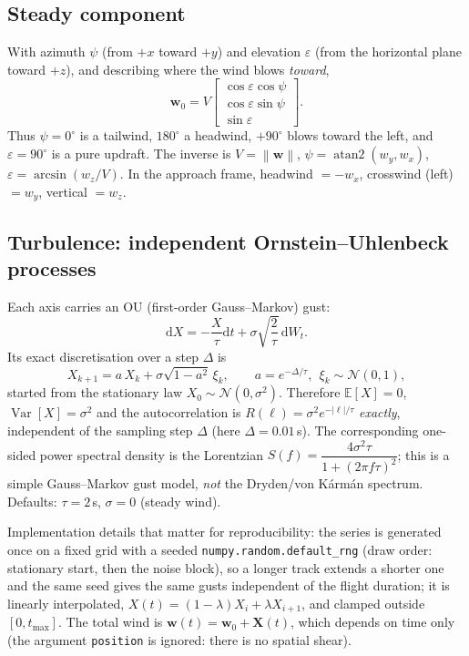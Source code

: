 \documentclass[11pt,a4paper]{article}
\newcommand{\vc}[1]{\bm{#1}}
\newcommand{\norm}[1]{\left\lVert #1\right\rVert}
\newcommand{\dd}{\mathrm{d}}
\newcommand{\code}[1]{\texttt{\small #1}}
\begin{document}
\subsection{Steady component}
With azimuth $\psi$ (from $+x$ toward $+y$) and elevation $\varepsilon$ (from the horizontal plane toward $+z$), and describing where the wind blows \emph{toward},
\begin{equation}
\vc w_0=V\begin{bmatrix}\cos\varepsilon\cos\psi\\\cos\varepsilon\sin\psi\\\sin\varepsilon\end{bmatrix}.
\end{equation}
Thus $\psi=0^\circ$ is a tailwind, $180^\circ$ a headwind, $+90^\circ$ blows toward the left, and $\varepsilon=90^\circ$ is a pure updraft. The inverse is
$V=\norm{\vc w}$, $\psi=\operatorname{atan2}(w_y,w_x)$, $\varepsilon=\arcsin(w_z/V)$. In the approach frame, headwind $=-w_x$, crosswind (left) $=w_y$, vertical $=w_z$.

\subsection{Turbulence: independent Ornstein--Uhlenbeck processes}
Each axis carries an OU (first-order Gauss--Markov) gust:
\begin{equation}
\dd X=-\frac{X}{\tau}\dd t+\sigma\sqrt{\frac2\tau}\,\dd W_t .
\end{equation}
Its exact discretisation over a step $\Delta$ is
\begin{equation}
X_{k+1}=a\,X_k+\sigma\sqrt{1-a^2}\,\xi_k,\qquad a=e^{-\Delta/\tau},\ \ \xi_k\sim\mathcal N(0,1),
\end{equation}
started from the stationary law $X_0\sim\mathcal N(0,\sigma^2)$. Therefore $\mathbb E[X]=0$, $\operatorname{Var}[X]=\sigma^2$ and the autocorrelation is
$R(\ell)=\sigma^2e^{-|\ell|/\tau}$ \emph{exactly}, independent of the sampling step $\Delta$ (here $\Delta=0.01$\,s). The corresponding one-sided power spectral density
is the Lorentzian $S(f)=\dfrac{4\sigma^2\tau}{1+(2\pi f\tau)^2}$; this is a simple Gauss--Markov gust model, \emph{not} the Dryden/von K\'arm\'an spectrum.
Defaults: $\tau=2$\,s, $\sigma=0$ (steady wind).

Implementation details that matter for reproducibility: the series is generated once on a fixed grid with a seeded \code{numpy.random.default_rng}
(draw order: stationary start, then the noise block), so a longer track extends a shorter one and the same seed gives the same gusts independent of the flight duration;
it is linearly interpolated, $X(t)=(1-\lambda)X_i+\lambda X_{i+1}$, and clamped outside $[0,t_{\max}]$.
The total wind is $\vc w(t)=\vc w_0+\vc X(t)$, which depends on time only (the argument \code{position} is ignored: there is no spatial shear).
\end{document}
